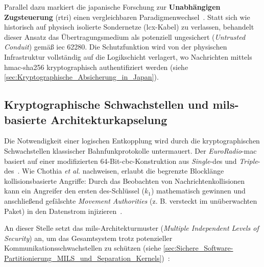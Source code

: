 \documentclass[runningheads]{res/llncs}
\begin{document}
Parallel dazu markiert die japanische Forschung zur \textbf{Unabhängigen Zugsteuerung} (\gls{rtri}) einen vergleichbaren Paradigmenwechsel~\parencite[S. 1--3]{iwamotoTrain2024}. Statt sich wie historisch auf physisch isolierte Sondernetze (\gls{lcx}-Kabel) zu verlassen, behandelt dieser Ansatz das Übertragungsmedium als potenziell ungesichert (\textit{Untrusted Conduit}) gemäß \gls{iec} 62280. Die Schutzfunktion wird von der physischen Infrastruktur vollständig auf die Logikschicht verlagert, wo Nachrichten mittels \gls{hmac-sha256} kryptographisch authentifiziert werden (siehe \autoref{sec:Kryptographische_Absicherung_in_Japan}).

\subsection{\texorpdfstring{Kryptographische Schwachstellen und \gls{mils}-basierte Architekturkapselung}{Kryptographische Schwachstellen und MILS-basierte Architekturkapselung}}
\label{sec:Kryptographische_Schwachstellen_und_MILS-basierte_Architekturkapselung}
Die Notwendigkeit einer logischen Entkopplung wird durch die kryptographischen Schwachstellen klassischer Bahnfunkprotokolle untermauert. Der \textit{EuroRadio}-\gls{mac} basiert auf einer modifizierten 64-Bit-\gls{cbc}-Konstruktion aus \textit{Single}-\gls{des} und \textit{Triple}-\gls{des}~\parencite[S. 751]{chothiaAttack2017}. Wie Chothia \textit{et al.} nachweisen, erlaubt die begrenzte Blocklänge kollisionsbasierte Angriffe: Durch das Beobachten von Nachrichtenkollisionen kann ein Angreifer den ersten \gls{des}-Schlüssel ($k_1$) mathematisch gewinnen und anschließend gefälschte \textit{Movement Authorities} (z. B. versteckt im unüberwachten Paket) in den Datenstrom injizieren~\parencite[S. 751--754]{chothiaAttack2017}.

An dieser Stelle setzt das \gls{mils}-Architekturmuster (\textit{Multiple Independent Levels of Security}) an, um das Gesamtsystem trotz potenzieller Kommunikationsschwachstellen zu schützen (siehe \autoref{sec:Sichere_Software-Partitionierung_MILS_und_Separation_Kernels})~\parencite[S. 31--32]{schulzIntegration2019}:
\end{document}
